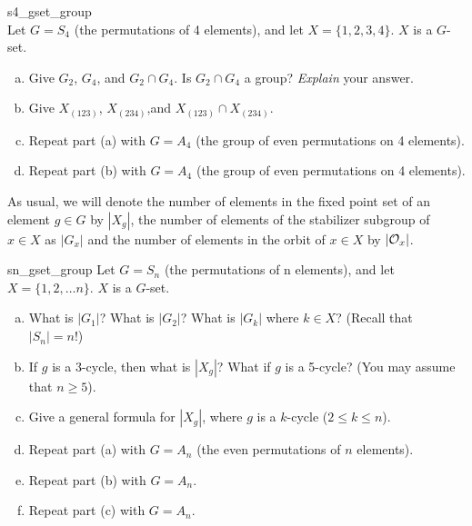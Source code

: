 
\begin{exercise}{s4_gset_group}
\\
Let $G = S_4$ (the permutations of 4 elements), and let $X = \{1,2,3,4\}$.  $X$ is a $G$-set.
\begin{enumerate}[(a)]
\item
Give $G_2$, $G_4$, and $G_2 \cap G_4$.  Is $G_2 \cap G_4$ a group? \emph{Explain} your answer.
\item
Give $X_{(123)}$, $X_{(234)}$,and  $X_{(123)} \cap X_{(234)}$.
\item
Repeat part (a) with $G=A_4$ (the group of even permutations on 4 elements).
\item
Repeat part (b) with $G=A_4$ (the group of even permutations on 4 elements).
\end{enumerate}
\end{exercise} 
As usual, we will denote the number of elements in the fixed point set of an
element $g \in G$ by $|X_g|$, the number of elements of the stabilizer subgroup of $x\in X$ as $|G_x|$ and the number of elements in the orbit of $x \in X$ by $|{\cal O}_x|$.

\begin{exercise}{sn_gset_group}
Let $G = S_n$ (the permutations of n elements), and let $X = \{1,2,\ldots n \}$.  $X$ is a $G$-set.
\begin{enumerate}[(a)]
\item
What is $|G_1|$? What is $|G_2|$? What is $|G_k|$ where $k \in X$?  (Recall that $|S_n| = n!$)
\item
If $g$ is a $3$-cycle, then what is $|X_g|$? What if $g$  is a 5-cycle?  (You may assume that $n \ge 5$).
\item
Give a general formula for $|X_g|$, where $g$ is a $k$-cycle ($2 \le k \le n$).
\item
Repeat part (a) with $G = A_n$ (the even permutations of $n$ elements).
\item
Repeat part (b) with $G = A_n$.
\item
Repeat part (c) with $G = A_n$.
\end{enumerate}
\end{exercise}

